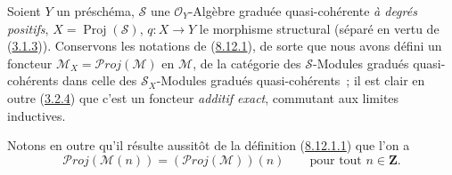 \begin{env}[8.14.1]
\label{II.8.14.1-fr}
Soient $Y$ un préschéma, $\mathcal{S}$ une $\mathcal{O}_Y$-Algèbre graduée
quasi-cohérente \emph{à degrés positifs},
$X=\operatorname{Proj}(\mathcal{S})$, $q:X\to Y$ le morphisme structural
(séparé en vertu de (\hyperref[II.3.1.3-fr]{3.1.3})). Conservons les
notations de (\hyperref[II.8.12.1-fr]{8.12.1}), de sorte que nous avons
défini un foncteur
$\mathcal{M}_X=\mathcal{P}\mathit{roj}(\mathcal{M})$ en $\mathcal{M}$, de la
catégorie des $\mathcal{S}$-Modules gradués quasi-cohérents dans celle des
$\mathcal{S}_X$-Modules gradués quasi-cohérents~; il est clair en outre
(\hyperref[II.3.2.4-fr]{3.2.4}) que c'est un foncteur \emph{additif exact},
commutant aux limites inductives.

Notons en outre qu'il résulte aussitôt de la définition
(\hyperref[II.8.12.1.1-fr]{8.12.1.1}) que l'on a
\begin{equation}
\label{II.8.14.1.1-fr}
  \mathcal{P}\mathit{roj}(\mathcal{M}(n))
  =(\mathcal{P}\mathit{roj}(\mathcal{M}))(n)
  \qquad\text{pour tout }n\in\mathbf{Z}.
\tag{8.14.1.1}
\end{equation}
\end{env}

